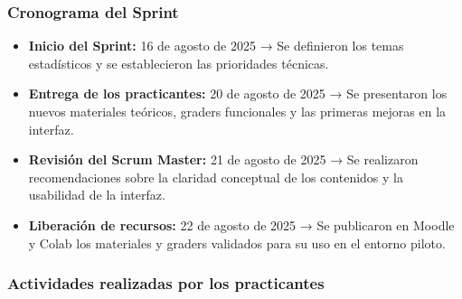 \documentclass[letter,oneside,12pt,spanish]{report}
\begin{document}
\subsubsection*{Cronograma del Sprint}
\begin{itemize}
	\item \textbf{Inicio del Sprint:} 16 de agosto de 2025 → Se definieron los temas estadísticos y se establecieron las prioridades técnicas.
	\item \textbf{Entrega de los practicantes:} 20 de agosto de 2025 → Se presentaron los nuevos materiales teóricos, graders funcionales y las primeras mejoras en la interfaz.
	\item \textbf{Revisión del Scrum Master:} 21 de agosto de 2025 → Se realizaron recomendaciones sobre la claridad conceptual de los contenidos y la usabilidad de la interfaz.
	\item \textbf{Liberación de recursos:} 22 de agosto de 2025 → Se publicaron en Moodle y Colab los materiales y graders validados para su uso en el entorno piloto.
\end{itemize}

\subsubsection*{Actividades realizadas por los practicantes}
\end{document}
